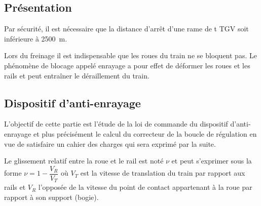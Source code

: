 \documentclass[10pt,fleqn]{article} %
\begin{document}

\vspace{5cm}
\pagestyle{fancy}
\thispagestyle{plain}

\def\columnseprulecolor{\color{ocre}}
\setlength{\columnseprule}{0.4pt} 

\def\pathfig{images}

\begin{multicols}{2}

\subsection*{Présentation}

Par sécurité, il est nécessaire que la distance d'arrêt d'une rame de t TGV soit inférieure à \SI{2500}{m}. 

Lors du freinage il est indispensable que les roues du train ne se bloquent pas. Le phénomène de blocage appelé enrayage 
a pour effet de déformer les roues et les rails et peut entraîner le déraillement du train. 

\subsection*{Dispositif d'anti-enrayage}
L’objectif de cette partie est l’étude de la loi de commande du dispositif d’anti-enrayage
et plus précisément le calcul du correcteur de la boucle de régulation en
vue de satisfaire un cahier des charges qui sera exprimé par la suite.

Le glissement relatif entre la roue et le rail est noté $\nu$ et peut s'exprimer sous la forme $\nu=1-\dfrac{V_R}{V_T}$ où $V_T$ est la vitesse de translation du train par rapport aux rails et $V_R$ l'opposée de la vitesse du point de contact appartenant à la roue par rapport à son support (bogie).
%


\end{multicols}
\end{document}
